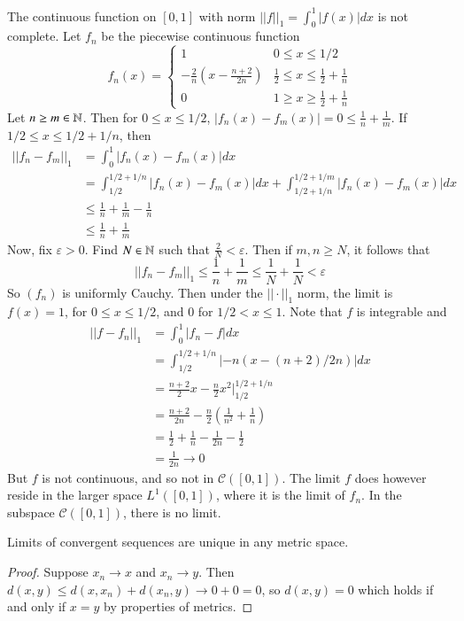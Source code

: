 \begin{eg}
    The continuous function on $[0,1]$ with norm $||f||_1 = \int_0^1|f(x)|dx$ is not complete. Let $f_n$ be the piecewise continuous function $$f_n(x) = \left\{\begin{array}{cc} 1 & 0 \leq x \leq 1/2 \\ -\frac{2}{n}\left(x-\frac{n+2}{2n}\right) & \frac{1}{2} \leq x \leq \frac{1}{2}+\frac{1}{n} \\ 0& 1\geq x \geq \frac{1}{2}+\frac{1}{n} \end{array}\right.$$ Let $n\geq m \in \mathbb N$. Then for $0 \leq x \leq 1/2$, $|f_n(x)-f_m(x)| = 0 \leq \frac{1}{n}+\frac{1}{m}$. If $1/2\leq x \leq 1/2+1/n$, then \begin{align*}
        ||f_n - f_m||_1 &= \int_0^1|f_n(x) - f_m(x)|dx \\
        &= \int_{1/2}^{1/2+1/n}|f_n(x)-f_m(x)|dx + \int_{1/2+1/n}^{1/2+1/m}|f_n(x)-f_m(x)|dx \\
        &\leq \frac{1}{n} + \frac{1}{m} - \frac{1}{n} \\
        &\leq \frac{1}{n} + \frac{1}{m}
    \end{align*}
    Now, fix $\varepsilon > 0$. Find $N \in \mathbb N$ such that $\frac{2}{N} < \varepsilon$. Then if $m,n \geq N$, it follows that $$||f_n - f_m||_1 \leq \frac{1}{n} + \frac{1}{m} \leq \frac{1}{N} + \frac{1}{N} < \varepsilon$$ So $(f_n)$ is uniformly Cauchy. Then under the $||\cdot||_1$ norm, the limit is $f(x) = 1$, for $0 \leq x \leq 1/2$, and $0$ for $1/2 < x \leq 1$. Note that $f$ is integrable and \begin{align*}
        ||f-f_n||_1 &= \int_0^1|f_n-f|dx\\
        &= \int_{1/2}^{1/2+1/n}|-n(x-(n+2)/2n)|dx \\
        &= \frac{n+2}{2}x-\frac{n}{2}x^2\vert_{1/2}^{1/2+1/n} \\
        &= \frac{n+2}{2n}-\frac{n}{2}\left(\frac{1}{n^2}+\frac{1}{n}\right) \\
        &= \frac{1}{2}+\frac{1}{n} - \frac{1}{2n} - \frac{1}{2} \\
        &= \frac{1}{2n}\rightarrow 0
    \end{align*}
    But $f$ is not continuous, and so not in $\mathcal{C}([0,1])$. The limit $f$ does however reside in the larger space $L^1([0,1])$, where it is the limit of $f_n$. In the subspace $\mathcal{C}([0,1])$, there is no limit.
\end{eg}

\begin{prop}
    Limits of convergent sequences are unique in any metric space.
\end{prop}
\begin{proof}
    Suppose $x_n\rightarrow x$ and $x_n \rightarrow y$. Then $d(x,y) \leq d(x,x_n)+d(x_n,y)\rightarrow 0+0 = 0$, so $d(x,y) = 0$ which holds if and only if $x=y$ by properties of metrics.
\end{proof}


